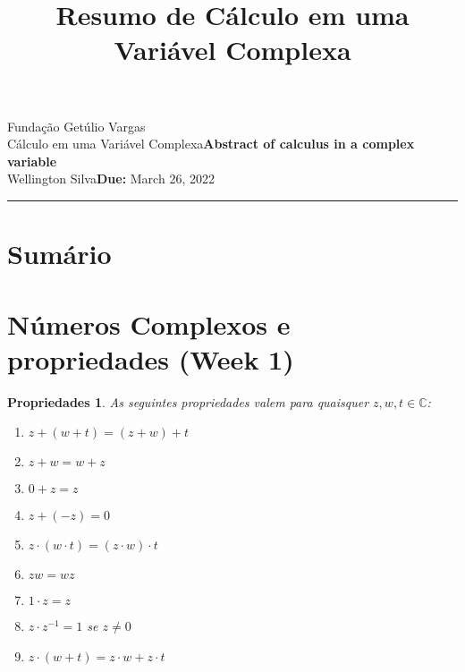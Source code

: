 \documentclass{article}
\title{Resumo de Cálculo em uma Variável Complexa}
\author{}
\date{}
\newtheorem{prop}{Propriedades}
\newcommand{\assignment}{Abstract of calculus in a complex variable}
\newcommand{\duedate}{March 26, 2022}
\begin{document}
Fundação Getúlio Vargas\hfill\\
Cálculo em uma Variável Complexa\hfill\textbf{\assignment}\\
Wellington Silva\hfill\textbf{Due:} \duedate\\
\smallskip\hrule\bigskip

{\let\newpage\relax\maketitle}
\maketitle

\section*{Sumário}

\textbf{}
\vspace{4.0mm}

\textbf{}
\vspace{4.0mm}

\textbf{}
\vspace{4.0mm}

\textbf{}
\vspace{4.0mm}

\textbf{}
\vspace{4.0mm}

\newpage

\section*{Números Complexos e propriedades (Week 1)}
\label{s1}

\begin{prop} As seguintes propriedades valem para quaisquer $z, w, t \in \mathbb{C}$:

\begin{enumerate}[label=(\alph*)]
    \item $z + (w + t) = (z + w) + t$
    \item $z + w = w + z$
    \item $0 + z = z$
    \item $z + (-z) = 0$
    \item $z \cdot (w \cdot t) = (z \cdot w) \cdot t$
    \item $zw = wz$
    \item $1 \cdot z = z$
    \item $z \cdot z^{-1} = 1$ se $z \neq 0$
    \item $z \cdot (w + t) = z \cdot w + z \cdot t$
\end{enumerate}
\end{prop}
\end{document}
